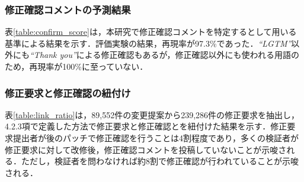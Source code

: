\documentclass[submit,techrep,noauthor]{ipsj}
\begin{document}
\subsubsection{修正確認コメントの予測結果}

\begin{table}[t]
\centering
  \caption{修正確認コメントの予測精度}
  \label{table:confirm_score}
\end{table}

表\ref{table:confirm_score}は，本研究で修正確認コメントを特定するとして用いる基準による結果を示す．評価実験の結果，再現率が97.3\%であった．\textit{``LGTM''}以外にも\textit{``Thank you''}による修正確認もあるが，修正確認以外にも使われる用語のため，再現率が100\%に至っていない．


\subsubsection{修正要求と修正確認の紐付け}

表\ref{table:link_ratio}は，89,552件の変更提案から239,286件の修正要求を抽出し，4.2.3項で定義した方法で修正要求と修正確認とを紐付けた結果を示す．修正要求提出者が後のパッチで修正確認を行うことは4割程度であり，多くの検証者が修正要求に対して改修後，修正確認コメントを投稿していないことが示唆される．ただし，検証者を問わなければ約8割で修正確認が行われていることが示唆される．

\end{document}
